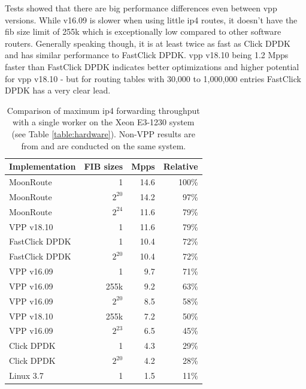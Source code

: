 Tests showed that there are big performance differences even between
\Ac{vpp} versions. While v16.09 is slower when using little \Ac{ip4}
routes, it doesn't have the \Ac{fib} size limit of 255k which is
exceptionally low compared to other software routers. Generally
speaking though, it is at least twice as fast as Click DPDK and has
similar performance to FastClick DPDK. \Ac{vpp} v18.10 being 1.2 Mpps
faster than FastClick DPDK indicates better optimizations and higher
potential for \Ac{vpp} v18.10 - but for routing tables with 30,000 to
1,000,000 entries FastClick DPDK has a very clear lead.


\begin{table}[!ht]
	\vspace{5ex}
	\begin{tabular}[]{ l r r r }
		Implementation	 & FIB sizes & Mpps		& Relative \\ 
		\midrule
		MoonRoute		 & 1		 & 14.6		& 100\% \\
		MoonRoute		 & $2^{20}$	 & 14.2		& 97\% \\
		MoonRoute		 & $2^{24}$	 & 11.6		& 79\% \\
		VPP v18.10		 & 1		 & 11.6		& 79\% \\
		FastClick DPDK	 & 1		 & 10.4 	& 72\% \\
		FastClick DPDK	 & $2^{20}$	 & 10.4 	& 72\% \\
		VPP v16.09		 & 1		 & 9.7	 	& 71\% \\
		VPP v16.09		 & 255k		 & 9.2	 	& 63\% \\
		VPP v16.09		 & $2^{20}$	 & 8.5	 	& 58\% \\
		VPP v18.10		 & 255k		 & 7.2	 	& 50\% \\
		VPP v16.09		 & $2^{23}$	 & 6.5	 	& 45\% \\
		Click DPDK		 & 1		 & 4.3 		& 29\% \\
		Click DPDK		 & $2^{20}$	 & 4.2 		& 28\% \\
		Linux 3.7		 & 1		 & 1.5 		& 11\% \\

		\midrule
	\end{tabular}
	\caption{Comparison of maximum \Ac{ip4} forwarding throughput with a single worker on the Xeon E3-1230 system (see Table \ref{table:hardware}). Non-VPP results are from \cite{chair:architecture} and are conducted on the same system. }
	\label{table:comparison}
\end{table}



